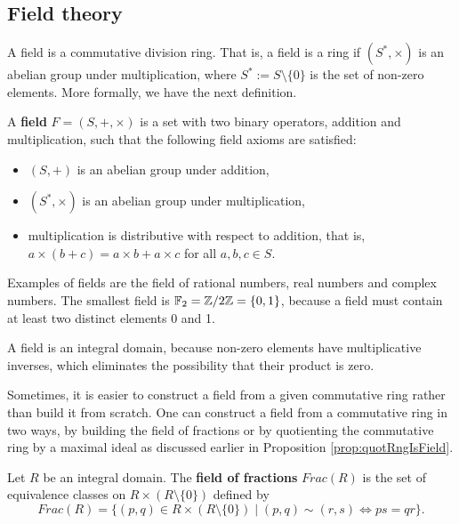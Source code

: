 \documentclass[../main.tex]{subfiles}
\begin{document}
\subsection{Field theory}
\label{subsection:field theory}

A field is a commutative division ring. That is, a field is a ring if $(S^*,\times)$ is an abelian group under multiplication, where $S^* := S \setminus \{0\}$ is the set of non-zero elements. More formally, we have the next definition.

\reversemarginpar
{}
\begin{definition}
A \textbf{field} $F=(S, +, \times)$ is a set with two binary operators, addition and multiplication, such that the following field axioms are satisfied:  
\begin{itemize}
     \item $(S,+)$ is an abelian group under addition, 
    \item $(S^*,\times)$ is an abelian group under multiplication,
    \item multiplication is distributive with respect to addition, that is, $a \times (b + c) = a \times b + a \times c$ for all $a, b, c\in S$.
\end{itemize}
\end{definition}
Examples of fields are the field of rational numbers, real numbers and complex numbers. The smallest field is $\mathbb{F}_2 =\mathbb{Z}/2\mathbb{Z} = \{0,1\}$, because a field must contain at least two distinct elements 0 and 1. 

A field is an integral domain, because non-zero elements have multiplicative inverses, which eliminates the possibility that their product is zero. 

Sometimes, it is easier to construct a field from a given commutative ring rather than build it from scratch. One can construct a field from a commutative ring in two ways, by building the field of fractions or by quotienting the commutative ring by a maximal ideal as discussed earlier in Proposition \ref{prop:quotRngIsField}. 

\reversemarginpar
{}
\begin{definition}
Let $R$ be an integral domain. The \textbf{field of fractions} $Frac(R)$ is the set of equivalence classes on $R \times (R \setminus \{0\})$ defined by 
\begin{equation*}
    Frac(R) = \{(p,q) \in R \times (R \setminus \{0\}) \mid (p,q) \sim (r,s) \iff ps = qr\}.
\end{equation*}
\end{definition}
\end{document}
